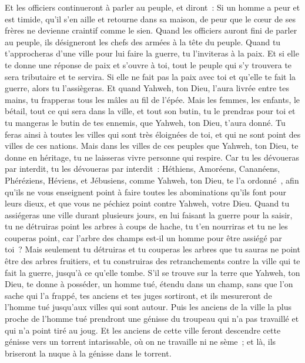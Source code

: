 \begin{multicols}{2}
Et les officiers continueront à parler au peuple, et diront~: Si un homme a peur et est timide, qu'il s'en aille et retourne dans sa maison, de peur que le cœur de ses frères ne devienne craintif comme le sien.
Quand les officiers auront fini de parler au peuple, ils désigneront les chefs des armées à la tête du peuple.
Quand tu t'approcheras d'une ville pour lui faire la guerre, tu l'inviteras à la paix.
Et si elle te donne une réponse de paix et s'ouvre à toi, tout le peuple qui s'y trouvera te sera tributaire et te servira.
Si elle ne fait pas la paix avec toi et qu'elle te fait la guerre, alors tu l'assiègeras.
Et quand Yahweh, ton Dieu, l'aura livrée entre tes mains, tu frapperas tous les mâles au fil de l'épée.
Mais les femmes, les enfants, le bétail, tout ce qui sera dans la ville, et tout son butin, tu le prendras pour toi et tu mangeras le butin de tes ennemis, que Yahweh, ton Dieu, t'aura donné.
Tu feras ainsi à toutes les villes qui sont très éloignées de toi, et qui ne sont point des villes de ces nations.
Mais dans les villes de ces peuples que Yahweh, ton Dieu, te donne en héritage, tu ne laisseras vivre personne qui respire.
Car tu les dévoueras par interdit, tu les dévoueras par interdit~: Héthiens, Amoréens, Cananéens, Phéréziens, Héviens, et Jébusiens, comme Yahweh, ton Dieu, te l'a ordonné~,
afin qu'ils ne vous enseignent point à faire toutes les abominations qu'ils font pour leurs dieux, et que vous ne péchiez point contre Yahweh, votre Dieu.
Quand tu assiégeras une ville durant plusieurs jours, en lui faisant la guerre pour la saisir, tu ne détruiras point les arbres à coups de hache, tu t'en nourriras et tu ne les couperas point, car l'arbre des champs est-il un homme pour être assiégé par toi~?
Mais seulement tu détruiras et tu couperas les arbres que tu sauras ne point être des arbres fruitiers, et tu construiras des retranchements contre la ville qui te fait la guerre, jusqu'à ce qu'elle tombe.
\VerseOne{}S'il se trouve sur la terre que Yahweh, ton Dieu, te donne à posséder, un homme tué, étendu dans un champ, sans que l'on sache qui l'a frappé,
tes anciens et tes juges sortiront, et ils mesureront de l'homme tué jusqu'aux villes qui sont autour.
Puis les anciens de la ville la plus proche de l'homme tué prendront une génisse du troupeau qui n'a pas travaillé et qui n'a point tiré au joug.
Et les anciens de cette ville feront descendre cette génisse vers un torrent intarissable, où on ne travaille ni ne sème~; et là, ils briseront la nuque à la génisse dans le torrent.

\end{multicols}
